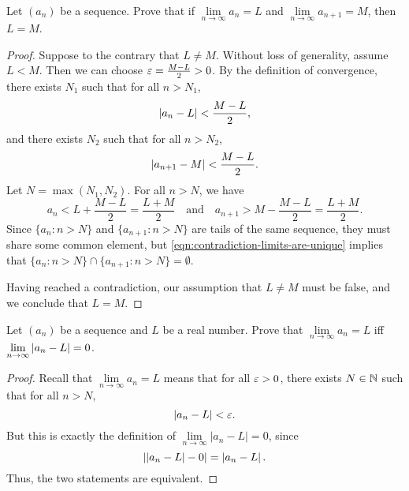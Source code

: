 \begin{problem}
  \label{prob:limit-of-shifted-sequence-equal}
  Let $(a_{n})$ be a sequence. Prove that if $\lim\limits_{n \to \infty} a_{n} = L$ 
  and $\lim\limits_{n \to \infty} a_{n+1} = M$, then $L = M$.

  \begin{proof}
    Suppose to the contrary that $L \neq M$. Without loss of generality, assume $L < M$. Then
    we can choose $\varepsilon = \frac{M - L}{2} > 0$. By the definition of convergence, there exists $N_{1}$ such that for all $n > N_{1}$,
    \[
      \left\lvert a_{n} - L \right\rvert < \frac{M - L}{2},
    \]
    and there exists $N_{2}$ such that for all $n > N_{2}$,
    \[
      \left\lvert a_{n+1} - M \right\rvert < \frac{M - L}{2}.
    \]
    Let $N = \max(N_{1}, N_{2})$. For all $n > N$, we have
    \begin{equation}
      a_{n} < L + \frac{M - L}{2} = \frac{L + M}{2} \quad \text{and} \quad a_{n+1} > M - \frac{M - L}{2} = \frac{L + M}{2}. \label{eqn:contradiction-limits-are-unique}
    \end{equation}
    Since $\{ a_{n} : n > N \}$ and $\{ a_{n+1} : n > N \}$ are tails of the same sequence, they must share some common element,
    but \eqref{eqn:contradiction-limits-are-unique} implies that $\{ a_{n} : n > N \} \cap \{ a_{n+1} : n > N \} = \emptyset$.

    Having reached a contradiction, our assumption that $L \neq M$ must be false, and we conclude that $L = M$.
  \end{proof}

\end{problem}

\begin{problem}
  Let $(a_{n})$ be a sequence and $L$ be a real number. Prove that
  $\lim\limits_{n \to \infty} a_{n} = L$ iff $\lim\limits_{n \to \infty} \left\lvert a_{n} - L \right\rvert = 0$.

  \begin{proof}
    Recall that $\lim\limits_{n \to \infty} a_n = L$ means that for all $\varepsilon > 0$, there exists $N \in \mathbb{N}$ such that for all $n > N$,
    \[
      \left\lvert a_{n} - L \right\rvert < \varepsilon.
    \]
    But this is exactly the definition of $\lim\limits_{n \to \infty} |a_n - L| = 0$, since
    \[
      \left\lvert \left\lvert a_{n} - L \right\rvert - 0 \right\rvert = \left\lvert a_{n} - L \right\rvert.
    \]
    Thus, the two statements are equivalent.
  \end{proof}
\end{problem}

